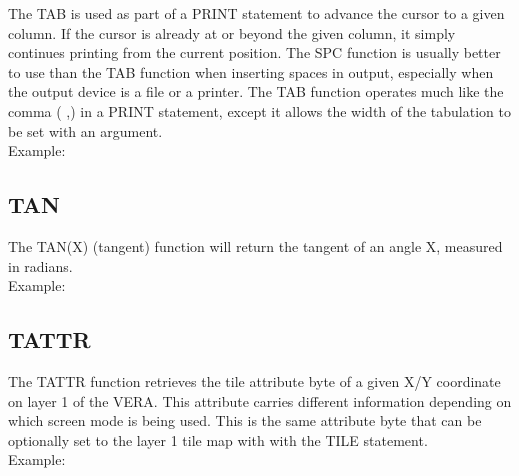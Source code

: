 The {\ttfamily TAB} is used as part of a {\ttfamily PRINT} statement to advance
the cursor to a given column.  If the cursor is already at or beyond the given
column, it simply continues printing from the current position.  The {\ttfamily
SPC} function is usually better to use than the {\ttfamily TAB} function when
inserting spaces in output, especially when the output device is a file or a
printer.  The {\ttfamily TAB} function operates much like the comma ({\ttfamily
,}) in a {\ttfamily PRINT} statement, except it allows the width of the
tabulation to be set with an argument.\\

Example:\\


\subsection{TAN}

The {\ttfamily TAN(X)} (tangent) function will return the tangent of an angle
{\ttfamily X}, measured in radians.\\

Example:\\


\subsection{TATTR}

The {\ttfamily TATTR} function retrieves the tile attribute byte of a given X/Y
coordinate on layer 1 of the VERA.  This attribute carries different
information depending on which screen mode is being used.  This is the same
attribute byte that can be optionally set to the layer 1 tile map with with the
{\ttfamily TILE} statement.\\

Example:\\


